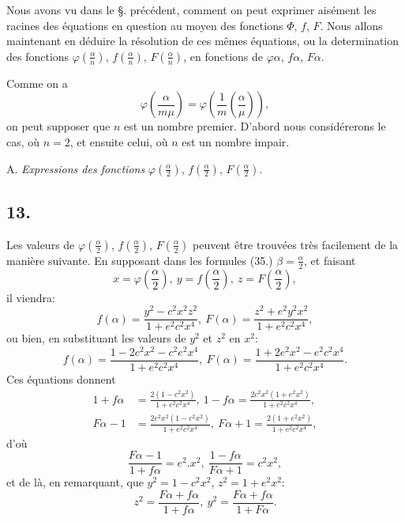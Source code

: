 \documentclass{article}
\begin{document}
Nous avons vu dans le §. précédent, comment on peut exprimer aisément les racines des équations en question au moyen des fonctions $\Phi$, $f$, $F$. Nous allons maintenant en déduire la résolution de ces mêmes équations, ou la determination des fonctions $\varphi\left(\frac{\alpha}{n}\right)$, $f\left(\frac{\alpha}{n}\right)$, $F\left(\frac{\alpha}{n}\right)$, en fonctions de $\varphi\alpha$, $f\alpha$, $F\alpha$.


Comme on a
\[ \varphi\left(\frac{\alpha}{m\mu}\right)=\varphi\left(\frac{1}{m}\left(\frac{\alpha}{\mu}\right)\right), \]
on peut supposer que $n$ est un nombre premier. D'abord nous considérerons le cas, où $n=2$, et ensuite celui, où $n$ est un nombre impair.

A. \emph{Expressions des fonctions} $\varphi\left(\frac{\alpha}{2}\right)$, $f\left(\frac{\alpha}{2}\right)$, $F\left(\frac{\alpha}{2}\right)$.

\subsection*{13.}

Les valeurs de $\varphi\left(\frac{\alpha}{2}\right)$, $f\left(\frac{\alpha}{2}\right)$, $F\left(\frac{\alpha}{2}\right)$ peuvent être trouvées très facilement de la manière suivante. En supposant dans les formules (35.) $\beta=\frac{\alpha}{2}$, et faisant
\[ x=\varphi\left(\frac{\alpha}{2}\right),\ y=f\left(\frac{\alpha}{2}\right),\ z=F\left(\frac{\alpha}{2}\right), \]
il viendra:
\[ f(\alpha)=\frac{y^{2}-c^{2}x^{2}z^{2}}{1+e^{2}c^{2}x^{4}},\ F(\alpha)=\frac{z^{2}+e^{2}y^{2}x^{2}}{1+e^{2}c^{2}x^{4}}, \]
ou bien, en substituant les valeurs de $y^{2}$ et $z^{2}$ en $x^{2}$:
\[ f(\alpha)=\frac{1-2c^{2}x^{2}-c^{2}e^{2}x^{4}}{1+e^{2}c^{2}x^{4}},\ F(\alpha)=\frac{1+2e^{2}x^{2}-e^{2}c^{2}x^{4}}{1+e^{2}c^{2}x^{4}}. \]
Ces équations donnent
\[ \begin{aligned}
1+f\alpha&=\frac{2(1-c^{2}x^{2})}{1+e^{2}c^{2}x^{4}},\ 1-f\alpha=\frac{2c^{2}x^{2}(1+e^{2}x^{2})}{1+e^{2}c^{2}x^{4}},\\
F\alpha-1&=\frac{2e^{2}x^{2}(1-c^{2}x^{2})}{1+e^{2}c^{2}x^{4}},\ F\alpha+1=\frac{2(1+e^{2}x^{2})}{1+e^{2}c^{2}x^{4}},
\end{aligned} \]
d'où
\[ \frac{F\alpha-1}{1+f\alpha}=e^{2}.x^{2},\ \frac{1-f\alpha}{F\alpha+1}=c^{2}x^{2}, \]
et de là, en remarquant, que $y^{2}=1-c^{2}x^{2}$, $z^{2}=1+e^{2}x^{2}$:
\[ z^{2}=\frac{F\alpha+f\alpha}{1+f\alpha},\ y^{2}=\frac{F\alpha+f\alpha}{1+F\alpha}. \]
\end{document}
